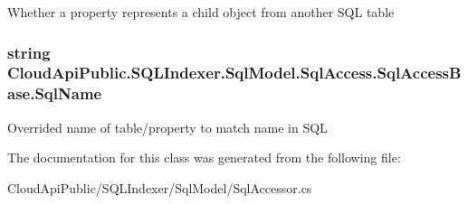 Whether a property represents a child object from another S\-Q\-L table 

\hypertarget{class_cloud_api_public_1_1_s_q_l_indexer_1_1_sql_model_1_1_sql_access_1_1_sql_access_base_ae9093d6a0cfb633b4de891c2060959c0}{
\subsubsection[{Sql\-Name}]{\setlength{\rightskip}{0pt plus 5cm}string Cloud\-Api\-Public.\-S\-Q\-L\-Indexer.\-Sql\-Model.\-Sql\-Access.\-Sql\-Access\-Base.\-Sql\-Name\hspace{0.3cm}{\ttfamily [get]}}}\label{class_cloud_api_public_1_1_s_q_l_indexer_1_1_sql_model_1_1_sql_access_1_1_sql_access_base_ae9093d6a0cfb633b4de891c2060959c0}


Overrided name of table/property to match name in S\-Q\-L 



The documentation for this class was generated from the following file\-:\begin{DoxyCompactItemize}
\item 
Cloud\-Api\-Public/\-S\-Q\-L\-Indexer/\-Sql\-Model/Sql\-Accessor.\-cs\end{DoxyCompactItemize}
